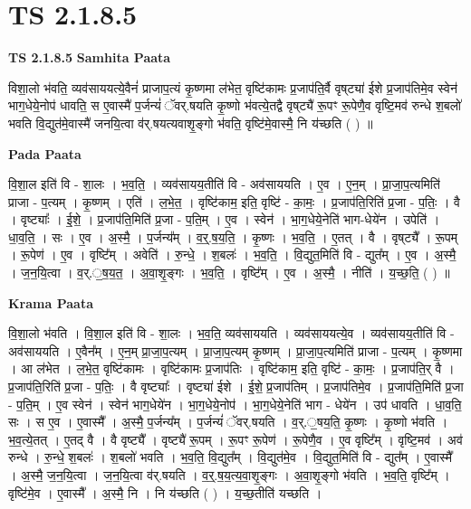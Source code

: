 \documentclass[17pt]{extarticle}
\begin{document}
\section*{ TS 2.1.8.5 }

\textbf{TS 2.1.8.5 } \newline
\textbf{Samhita Paata} \newline

विशा॒लो भ॑वति॒ व्यव॑साययत्ये॒वैनं॑ प्राजाप॒त्यं कृ॒ष्णमा ल॑भेत॒ वृष्टि॑कामः प्र॒जाप॑ति॒र्वै वृष्‌ट्या॑ ईशे प्र॒जाप॑तिमे॒व स्वेन॑ भाग॒धेये॒नोप॑ धावति॒ स ए॒वास्मै॑ प॒र्जन्यं॑ ॅवर्.षयति कृ॒ष्णो भ॑वत्ये॒तद्वै वृष्‌ट्यै॑ रू॒पꣳ रू॒पेणै॒व वृष्टि॒मव॑ रुन्धे श॒बलो॑ भवति वि॒द्युत॑मे॒वास्मै॑ जनयि॒त्वा व॑र्.षयत्यवाशृ॒ङ्गो भ॑वति॒ वृष्टि॑मे॒वास्मै॒ नि य॑च्छति ( ) ॥ \newline

\textbf{Pada Paata} \newline

वि॒शा॒ल इति॑ वि - शा॒लः । भ॒व॒ति॒ । व्यव॑सायय॒तीति॑ वि - अव॑साययति । ए॒व । ए॒न॒म् । प्रा॒जा॒प॒त्यमिति॑ प्राजा - प॒त्यम् । कृ॒ष्णम् । एति॑ । ल॒भे॒त॒ । वृष्टि॑काम॒ इति॒ वृष्टि॑ - का॒मः॒ । प्र॒जाप॑ति॒रिति॑ प्र॒जा - प॒तिः॒ । वै । वृष्ट्याः᳚ । ई॒शे॒ । प्र॒जाप॑ति॒मिति॑ प्र॒जा - प॒ति॒म् । ए॒व । स्वेन॑ । भा॒ग॒धेये॒नेति॑ भाग-धेये॑न । उपेति॑ । धा॒व॒ति॒ । सः । ए॒व । अ॒स्मै॒ । प॒र्जन्य᳚म् । व॒र्॒.ष॒य॒ति॒ । कृ॒ष्णः । भ॒व॒ति॒ । ए॒तत् । वै । वृष्‌ट्यै᳚ । रू॒पम् । रू॒पेण॑ । ए॒व । वृष्टि᳚म् । अवेति॑ । रु॒न्धे॒ । श॒बलः॑ । भ॒व॒ति॒ । वि॒द्युत॒मिति॑ वि - द्युत᳚म् । ए॒व । अ॒स्मै॒ । ज॒न॒यि॒त्वा । व॒र्.॒ष॒य॒त॒ । अ॒वा॒शृ॒ङ्गः । भ॒व॒ति॒ । वृष्टि᳚म् । ए॒व । अ॒स्मै॒ । नीति॑ । य॒च्छ॒ति॒ ( ) ॥  \newline


\textbf{Krama Paata} \newline

वि॒शा॒लो भ॑वति । वि॒शा॒ल इति॑ वि - शा॒लः । भ॒व॒ति॒ व्यव॑साययति । व्यव॑साययत्ये॒व । व्यव॑सायय॒तीति॑ वि - अव॑साययति । ए॒वैन᳚म् । ए॒न॒म् प्रा॒जा॒प॒त्यम् । प्रा॒जा॒प॒त्यम् कृ॒ष्णम् । प्रा॒जा॒प॒त्यमिति॑ प्राजा - प॒त्यम् । कृ॒ष्णमा । आ ल॑भेत । ल॒भे॒त॒ वृष्टि॑कामः । वृष्टि॑कामः प्र॒जाप॑तिः । वृष्टि॑काम॒ इति॒ वृष्टि॑ - का॒मः॒ । प्र॒जाप॑ति॒र् वै । प्र॒जाप॑ति॒रिति॑ प्र॒जा - प॒तिः॒ । वै वृष्ट्याः᳚ । वृष्ट्या॑ ईशे । ई॒शे॒ प्र॒जाप॑तिम् । प्र॒जाप॑तिमे॒व । प्र॒जाप॑ति॒मिति॑ प्र॒जा - प॒ति॒म् । ए॒व स्वेन॑ । स्वेन॑ भाग॒धेये॑न । भा॒ग॒धेये॒नोप॑ । भा॒ग॒धेये॒नेति॑ भाग - धेये॑न । उप॑ धावति । धा॒व॒ति॒ सः । स ए॒व । ए॒वास्मै᳚ । अ॒स्मै॒ प॒र्जन्य᳚म् । प॒र्जन्यं॑ ॅवर्.षयति । व॒र्.॒षय॒ति॒ कृ॒ष्णः । कृ॒ष्णो भ॑वति । भ॒व॒त्ये॒तत् । ए॒तद् वै । वै वृष्ट्यै᳚ । वृष्ट्यै॑ रू॒पम् । रू॒पꣳ रू॒पेण॑ । रू॒पेणै॒व । ए॒व वृष्टि᳚म् । वृष्टि॒मव॑ । अव॑ रुन्धे । रु॒न्धे॒ श॒बलः॑ । श॒बलो॑ भवति । भ॒व॒ति॒ वि॒द्युत᳚म् । वि॒द्युत॑मे॒व । वि॒द्युत॒मिति॑ वि - द्युत᳚म् । ए॒वास्मै᳚ । अ॒स्मै॒ ज॒न॒यि॒त्वा । ज॒न॒यि॒त्वा व॑र्.षयति । व॒र्॒.ष॒य॒त्य॒वा॒शृ॒ङ्गः । अ॒वा॒शृ॒ङ्गो भ॑वति । भ॒व॒ति॒ वृष्टि᳚म् । वृष्टि॑मे॒व । ए॒वास्मै᳚ । अ॒स्मै॒ नि । नि य॑च्छति ( ) । य॒च्छ॒तीति॑ यच्छति । \newline
\end{document}
